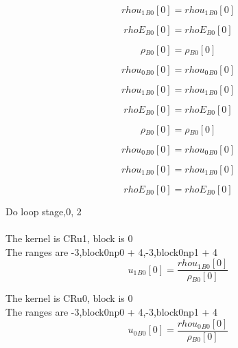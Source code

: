 \documentclass{article}
\begin{document}
\begin{dmath}{rhou_{1}{_{B0}}}[{0}] = {rhou_{1}{_{B0}}}[{0}]\end{dmath}

\begin{dmath}{rhoE{_{B0}}}[{0}] = {rhoE{_{B0}}}[{0}]\end{dmath}

\begin{dmath}{\rho{_{B0}}}[{0}] = {\rho{_{B0}}}[{0}]\end{dmath}

\begin{dmath}{rhou_{0}{_{B0}}}[{0}] = {rhou_{0}{_{B0}}}[{0}]\end{dmath}

\begin{dmath}{rhou_{1}{_{B0}}}[{0}] = {rhou_{1}{_{B0}}}[{0}]\end{dmath}

\begin{dmath}{rhoE{_{B0}}}[{0}] = {rhoE{_{B0}}}[{0}]\end{dmath}

\begin{dmath}{\rho{_{B0}}}[{0}] = {\rho{_{B0}}}[{0}]\end{dmath}

\begin{dmath}{rhou_{0}{_{B0}}}[{0}] = {rhou_{0}{_{B0}}}[{0}]\end{dmath}

\begin{dmath}{rhou_{1}{_{B0}}}[{0}] = {rhou_{1}{_{B0}}}[{0}]\end{dmath}

\begin{dmath}{rhoE{_{B0}}}[{0}] = {rhoE{_{B0}}}[{0}]\end{dmath}

\noindent Do loop stage,0, 2\\
\\\noindent The kernel is CRu1, block is 0\\\noindent The ranges are -3,block0np0 + 4,-3,block0np1 + 4\\\begin{dmath}{u_{1}{_{B0}}}[{0}] = \frac{{rhou_{1}{_{B0}}}[{0}]}{{\rho{_{B0}}}[{0}]}\end{dmath}

\noindent The kernel is CRu0, block is 0\\\noindent The ranges are -3,block0np0 + 4,-3,block0np1 + 4\\\begin{dmath}{u_{0}{_{B0}}}[{0}] = \frac{{rhou_{0}{_{B0}}}[{0}]}{{\rho{_{B0}}}[{0}]}\end{dmath}
\end{document}
